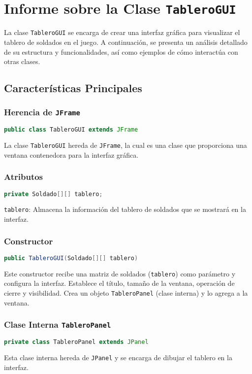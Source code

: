 
\section{Informe sobre la Clase \texttt{TableroGUI}}

La clase \texttt{TableroGUI} se encarga de crear una interfaz gráfica para visualizar el tablero de soldados en el juego. A continuación, se presenta un análisis detallado de su estructura y funcionalidades, así como ejemplos de cómo interactúa con otras clases.

\subsection{Características Principales}

\subsubsection{Herencia de \texttt{JFrame}}
\begin{lstlisting}[language=Java]
public class TableroGUI extends JFrame
\end{lstlisting}
La clase \texttt{TableroGUI} hereda de \texttt{JFrame}, la cual es una clase que proporciona una ventana contenedora para la interfaz gráfica.

\subsubsection{Atributos}
\begin{lstlisting}[language=Java]
private Soldado[][] tablero;
\end{lstlisting}
\texttt{tablero}: Almacena la información del tablero de soldados que se mostrará en la interfaz.

\subsubsection{Constructor}
\begin{lstlisting}[language=Java]
public TableroGUI(Soldado[][] tablero)
\end{lstlisting}
Este constructor recibe una matriz de soldados (\texttt{tablero}) como parámetro y configura la interfaz. Establece el título, tamaño de la ventana, operación de cierre y visibilidad. Crea un objeto \texttt{TableroPanel} (clase interna) y lo agrega a la ventana.

\subsubsection{Clase Interna \texttt{TableroPanel}}
\begin{lstlisting}[language=Java]
private class TableroPanel extends JPanel
\end{lstlisting}
Esta clase interna hereda de \texttt{JPanel} y se encarga de dibujar el tablero en la interfaz.

